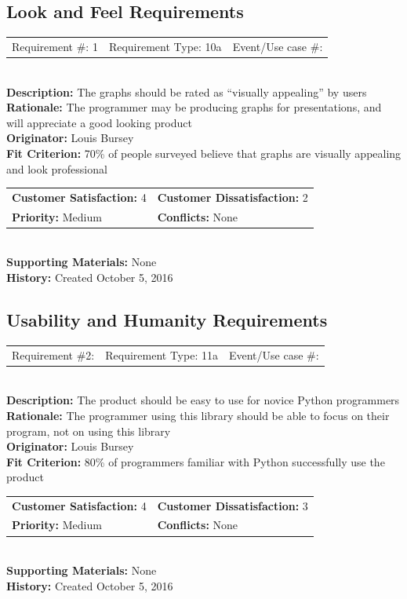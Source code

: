 \documentclass[12pt, titlepage]{article}
\begin{document}
\subsection{Look and Feel Requirements}
%
%
\begin{reqbox}
\begin{tabular}{ccc}
Requirement \#: 1& Requirement Type: 10a & Event/Use case \#: \\
\end{tabular} \\
\textbf{Description:} The graphs should be rated as ``visually appealing'' by users \\
\textbf{Rationale:} The programmer may be producing graphs for presentations, and will appreciate a good looking product \\
\textbf{Originator:} Louis Bursey\\
\textbf{Fit Criterion:} 70\% of people surveyed believe that graphs are visually appealing and look professional  \\
\begin{tabular}{ll}
\textbf{Customer Satisfaction:} 4 & \textbf{Customer Dissatisfaction:} 2 \\
\textbf{Priority:} Medium & \textbf{Conflicts:} None\\
\end{tabular} \\
\textbf{Supporting Materials:} None \\
\textbf{History:} Created October 5, 2016
\end{reqbox}
%
%
\subsection{Usability and Humanity Requirements}

%
%
\begin{reqbox}
\begin{tabular}{ccc}
Requirement \#2: & Requirement Type: 11a & Event/Use case \#: \\
\end{tabular} \\
\textbf{Description:} The product should be easy to use for novice Python programmers \\
\textbf{Rationale:} The programmer using this library should be able to focus on their program, not on using this library \\
\textbf{Originator:} Louis Bursey\\
\textbf{Fit Criterion:} 80\% of programmers familiar with Python successfully use the product  \\
\begin{tabular}{ll}
\textbf{Customer Satisfaction:} 4 & \textbf{Customer Dissatisfaction:} 3 \\
\textbf{Priority:} Medium & \textbf{Conflicts:} None\\
\end{tabular} \\
\textbf{Supporting Materials:} None \\
\textbf{History:} Created October 5, 2016
\end{reqbox}
\end{document}
